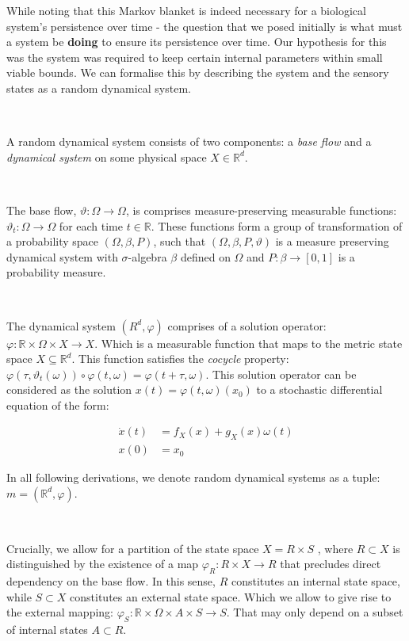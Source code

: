 \documentclass{article}
\newcommand{\R}{\mathbb{R}}
\begin{document}
While noting that this Markov blanket is indeed necessary for a biological system's persistence over time - the question that we posed initially is what must a system be \textbf{doing} to ensure its persistence over time. Our hypothesis for this was the system was required to keep certain internal parameters within small viable bounds. We can formalise this by describing the system and the sensory states as a random dynamical system. 

\

A random dynamical system consists of two components: a \textit{base flow} and a \textit{dynamical system} on some physical space $X \in \R^d$.

\

The base flow, $\vartheta: \Omega \to \Omega$, is comprises measure-preserving measurable functions: $\vartheta_t: \Omega \to \Omega$ for each time $t \in \R$. These functions form a group of transformation of a probability space $(\Omega, \beta, P)$, such that $(\Omega, \beta, P, \vartheta)$ is a measure preserving dynamical system with $\sigma$-algebra $\beta$ defined on $\Omega$ and $P: \beta \to [0, 1]$ is a probability measure.

\

The dynamical system $(R^d, \varphi)$ comprises of a solution operator: $\varphi: \R \times \Omega \times X \to X$. Which is a measurable function that maps to the metric state space $X \subseteq \mathbb{R}^d$. This function satisfies the \textit{cocycle} property: $\varphi(\tau, \vartheta_t(\omega)) \circ \varphi(t, \omega) = \varphi(t + \tau, \omega)$. This solution operator can be considered as the solution $x(t) = \varphi(t, \omega)(x_0)$ to a stochastic differential equation of the form:

\begin{equation}
	\begin{aligned}
		\dot{x}(t) &= f_X(x) + g_X(x)\omega(t) \\
		x(0) &= x_0
	\end{aligned}
\end{equation}

In all following derivations, we denote random dynamical systems as a tuple: $m = (\R^d, \varphi)$.

\

Crucially, we allow for a partition of the state space $X = R \times S$ , where $R \subset X$ is distinguished by  the existence of a map $\varphi_R : R \times X \to R$ that precludes direct dependency on the base flow. In this  sense, $R$ constitutes an internal state space, while $S \subset X$ constitutes an external state space. Which we allow to give rise to the external mapping: $\varphi_S: \R \times \Omega \times A \times S \to S$. That may only depend on a subset of internal states $A \subset R$. 
\end{document}
